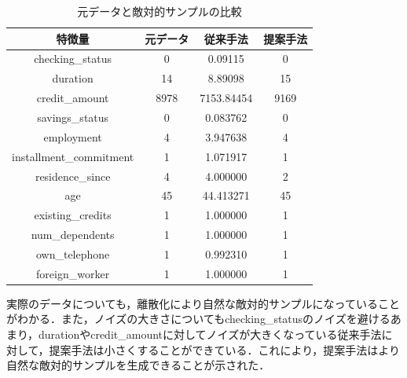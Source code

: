 \begin{table}[H]
    \centering
    \caption{元データと敵対的サンプルの比較}
    \begin{tabular}{|c|c|c|c|} \hline
        特徴量 & 元データ & 従来手法 & 提案手法 \\ \hline
        checking\_status & 0 & 0.09115 & 0\\ \hline
        duration & 14 & 8.89098 & 15 \\ \hline
        credit\_amount & 8978 & 7153.84454 & 9169 \\ \hline
        savings\_status & 0 & 0.083762 & 0\\ \hline
        employment & 4 & 3.947638  & 4 \\ \hline
        installment\_commitment & 1 & 1.071917 & 1\\ \hline
        residence\_since & 4 & 4.000000 & 2 \\ \hline
        age & 45 & 44.413271 & 45 \\ \hline
        existing\_credits & 1 & 1.000000 & 1 \\ \hline
        num\_dependents & 1 & 1.000000 & 1 \\ \hline
        own\_telephone & 1 & 0.992310 & 1 \\ \hline
        foreign\_worker & 1 & 1.000000 & 1 \\ \hline
    \end{tabular}
\end{table}

実際のデータについても，離散化により自然な敵対的サンプルになっていることがわかる．また，ノイズの大きさについてもchecking\_statusのノイズを避けるあまり，durationやcredit\_amountに対してノイズが大きくなっている従来手法に対して，提案手法は小さくすることができている．これにより，提案手法はより自然な敵対的サンプルを生成できることが示された．